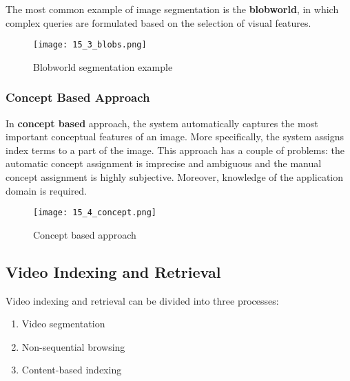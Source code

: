 \documentclass{article}
\begin{document}
The most common example of image segmentation is the \textbf{blobworld}, in which complex queries are formulated based on the selection of visual features.
\begin{figure}[H]
    \centering
    \texttt{[image: 15\_3\_blobs.png]}
    \caption{Blobworld segmentation example}
\end{figure}

\subsubsection{Concept Based Approach}
In \textbf{concept based} approach, the system automatically captures the most important conceptual features of an image. More specifically, the system assigns index terms to a part of the image.
This approach has a couple of problems: the automatic concept assignment is imprecise and ambiguous and the manual concept assignment is highly subjective. Moreover, knowledge of the application domain is required.
\begin{figure}[H]
    \centering
    \texttt{[image: 15\_4\_concept.png]}
    \caption{Concept based approach}
\end{figure}

\subsection{Video Indexing and Retrieval}
Video indexing and retrieval can be divided into three processes:
\begin{enumerate}
    \item Video segmentation
    \item Non-sequential browsing
    \item Content-based indexing
\end{enumerate}
\end{document}
